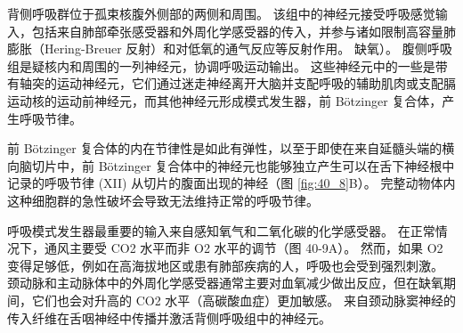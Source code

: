 背侧呼吸群位于孤束核腹外侧部的两侧和周围。 该组中的神经元接受呼吸感觉输入，包括来自肺部牵张感受器和外周化学感受器的传入，并参与诸如限制高容量肺膨胀（Hering-Breuer 反射）和对低氧的通气反应等反射作用。 缺氧）。 腹侧呼吸组是疑核内和周围的一列神经元，协调呼吸运动输出。 这些神经元中的一些是带有轴突的运动神经元，它们通过迷走神经离开大脑并支配呼吸的辅助肌肉或支配膈运动核的运动前神经元，而其他神经元形成模式发生器，前 Bötzinger 复合体，产生呼吸节律。

前 Bötzinger 复合体的内在节律性是如此有弹性，以至于即使在来自延髓头端的横向脑切片中，前 Bötzinger 复合体中的神经元也能够独立产生可以在舌下神经根中记录的呼吸节律 (XII) 从切片的腹面出现的神经（图 \ref{fig:40_8}B）。 完整动物体内这种细胞群的急性破坏会导致无法维持正常的呼吸节律。

呼吸模式发生器最重要的输入来自感知氧气和二氧化碳的化学感受器。 
在正常情况下，通风主要受 CO2 水平而非 O2 水平的调节（图 40-9A）。 
然而，如果 O2 变得足够低，例如在高海拔地区或患有肺部疾病的人，呼吸也会受到强烈刺激。 颈动脉和主动脉体中的外周化学感受器通常主要对血氧减少做出反应，但在缺氧期间，它们也会对升高的 CO2 水平（高碳酸血症）更加敏感。 来自颈动脉窦神经的传入纤维在舌咽神经中传播并激活背侧呼吸组中的神经元。

